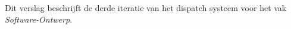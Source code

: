 Dit verslag beschrijft de derde iteratie van het dispatch systeem voor het vak \textit{Software-Ontwerp}.
